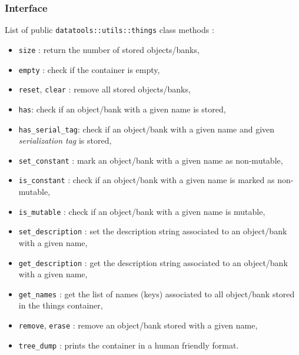 \subsubsection{Interface}

\pn List of public \texttt{datatools::utils::things} class methods :
\begin{itemize}

\item \texttt{size} : return the number of stored objects/banks,

\item \texttt{empty} : check if the container is empty,

\item   \texttt{reset},    \texttt{clear}   :   remove    all   stored
  objects/banks,

\item \texttt{has}: check if an object/bank with a given name is stored,

\item \texttt{has\_serial\_tag}: 
  check if an object/bank with a given name and given \emph{serialization tag} 
  is stored,

\item \texttt{set\_constant}  : mark an object/bank with  a given name as
  non-mutable,

\item \texttt{is\_constant}  : check if an object/bank  with a given name
  is marked as non-mutable,

\item \texttt{is\_mutable} : check if an object/bank with a given name is
  mutable,

\item   \texttt{set\_description}  :   set   the  description   string
  associated to an object/bank with a given name,

\item   \texttt{get\_description}  :   get   the  description   string
  associated to an object/bank with a given name,

\item \texttt{get\_names} : get the list of names (keys) associated to
  all object/bank stored in the things container,

\item \texttt{remove},  \texttt{erase} : remove  an object/bank stored
  with a given name,

\item \texttt{tree\_dump} : prints the container in a human friendly format.

\end{itemize}

